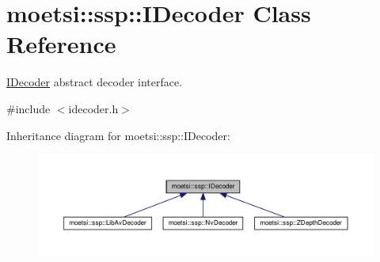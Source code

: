 \hypertarget{classmoetsi_1_1ssp_1_1IDecoder}{}\section{moetsi\+:\+:ssp\+:\+:I\+Decoder Class Reference}
\label{classmoetsi_1_1ssp_1_1IDecoder}


\hyperlink{classmoetsi_1_1ssp_1_1IDecoder}{I\+Decoder} abstract decoder interface.  




{\ttfamily \#include $<$idecoder.\+h$>$}



Inheritance diagram for moetsi\+:\+:ssp\+:\+:I\+Decoder\+:
\nopagebreak
\begin{figure}[H]
\begin{center}
\leavevmode
\includegraphics[width=350pt]{classmoetsi_1_1ssp_1_1IDecoder__inherit__graph}
\end{center}
\end{figure}
